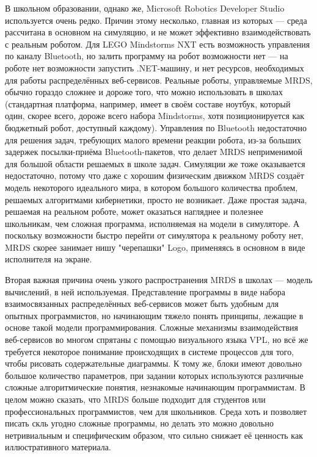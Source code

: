 \documentclass[a4paper]{article}
\begin{document}
В школьном образовании, однако же, Microsoft Robotics Developer Studio используется очень редко. Причин этому несколько, главная из которых --- среда рассчитана в основном на симуляцию, и не может эффективно взаимодействовать с реальным роботом. Для LEGO Mindstorms NXT есть возможность управления по каналу Bluetooth, но залить программу на робот возможности нет --- на роботе нет возможности запустить .NET-машину, и нет ресурсов, необходимых для работы распределённых веб-сервисов. Реальные роботы, управляемые MRDS, обычно гораздо сложнее и дороже того, что можно использовать в школах (стандартная платформа, например, имеет в своём составе ноутбук, который один, скорее всего, дороже всего набора Mindstorms, хотя позиционируется как бюджетный робот, доступный каждому). Управления по Bluetooth недостаточно для решения задач, требующих малого времени реакции робота, из-за больших задержек посылки-приёма Bluetooth-пакетов, что делает MRDS неприменимой для большой области решаемых в школе задач. Симуляции же тоже оказывается недостаточно, потому что даже с хорошим физическим движком MRDS создаёт модель некоторого идеального мира, в котором большого количества проблем, решаемых алгоритмами кибернетики, просто не возникает. Даже простая задача, решаемая на реальном роботе, может оказаться нагляднее и полезнее школьникам, чем сложная программа, исполняемая на модели в симуляторе. А поскольку возможности быстро перейти от симулятора к реальному роботу нет, MRDS скорее занимает нишу "черепашки" Logo, применяясь в основном в виде исполнителя на экране.

Вторая важная причина очень узкого распространения MRDS в школах --- модель вычислений, в ней используемая. Представление программы в виде набора взаимосвязанных распределённых веб-сервисов может быть удобным для опытных программистов, но начинающим тяжело понять принципы, лежащие в основе такой модели программирования. Сложные механизмы взаимодействия веб-сервисов во многом спрятаны с помощью визуального языка VPL, но всё же требуется некоторое понимание происходящих в системе процессов для того, чтобы рисовать содержательные диаграммы. К тому же, блоки имеют довольно большое количество параметров, при задании которых используются различные сложные алгоритмические понятия, незнакомые начинающим программистам. В целом можно сказать, что MRDS больше подходит для студентов или профессиональных программистов, чем для школьников. Среда хоть и позволяет писать скль угодно сложные программы, но делать это можно довольно нетривиальным и специфическим образом, что сильно снижает её ценность как иллюстративного материала.
\end{document}
